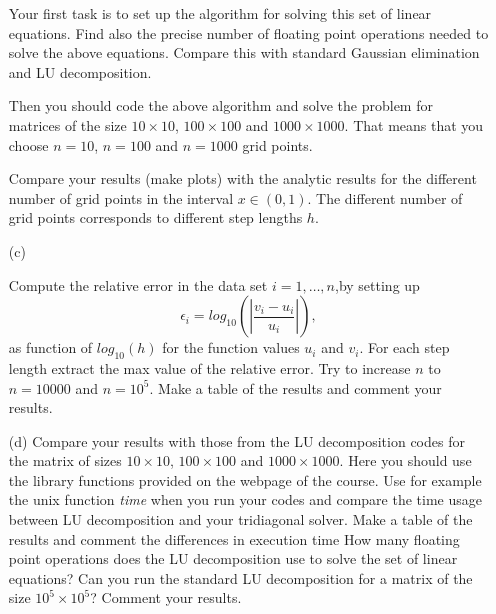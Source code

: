 \documentclass[11pt,a4wide]{article}
\begin{document}
\begin{enumerate}
Your first task is to set up the algorithm for solving this set of linear equations.
Find also the precise number of floating point 
operations needed to solve the above equations. 
Compare this with standard Gaussian elimination and LU decomposition.

Then you should code the above algorithm and solve the problem for matrices of the size
$10\times 10$, $100\times 100$ and $1000\times 1000$.  That means that you choose $n=10$, $n=100$ and
$n=1000$ grid points. 

Compare your results (make plots) with the analytic results for the different number of grid points  in the 
interval $x\in(0,1)$.  The different number of grid points corresponds to different step lengths $h$.

\item[(c)]

Compute the relative error  in the data set $i=1,\dots, n$,by setting up 
\[
   \epsilon_i=log_{10}\left(\left|\frac{v_i-u_i}
                 {u_i}\right|\right),
\]
as function of $log_{10}(h)$ for the function values $u_i$ and $v_i$.
For each step length extract the max value of the relative error.  
Try to increase $n$ to $n=10000$ and $n=10^5$.  Make a table of the results and 
comment your results. 

\item[(d)]
Compare your results with those from the LU decomposition codes for the matrix of sizes $10\times 10$, $100\times 100$ and
$1000\times 1000$. Here you should use the library functions provided  on the webpage of the course.
Use for example the unix function {\em time} when you run your codes 
and compare the time usage between LU decomposition and  your
tridiagonal solver.   Make a table of the results and comment the differences
in execution time
How many floating point operations does the LU decomposition use to solve the set of linear equations?
Can you run the standard LU decomposition
for a matrix of the size $10^5\times 10^5$?
Comment your results.
\end{enumerate}
\end{document}
